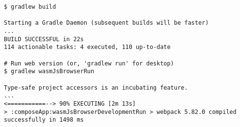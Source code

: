\begin{lstlisting}[language=terminal]
$ gradlew build

Starting a Gradle Daemon (subsequent builds will be faster)
...
BUILD SUCCESSFUL in 22s
114 actionable tasks: 4 executed, 110 up-to-date

# Run web version (or, 'gradlew run' for desktop)
$ gradlew wasmJsBrowserRun

Type-safe project accessors is an incubating feature.
...
<===========--> 90% EXECUTING [2m 13s]
> :composeApp:wasmJsBrowserDevelopmentRun > webpack 5.82.0 compiled successfully in 1498 ms
\end{lstlisting}

